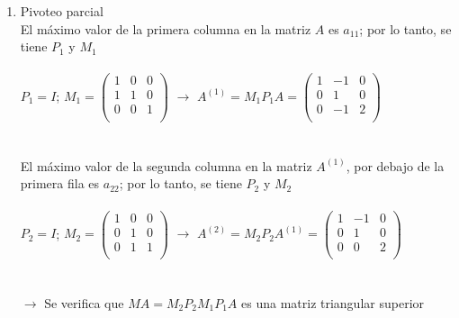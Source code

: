 \begin{enumerate}[]
    \begin{enumerate}[]
        \item Pivoteo parcial\\
        El máximo valor de la primera columna en la matriz $A$ es $a_{11}$; por lo tanto, se tiene $P_1$ y $M_1$\\
        \\
        $P_1 = I$; 
        $M_1 = \begin{pmatrix}
            1 & 0 & 0 \\ 
            1 & 1 & 0 \\
            0 & 0 & 1 \\
        \end{pmatrix} $ 
        $\xrightarrow{}$
        $A^{(1)}= M_1P_1A = \begin{pmatrix}
            1 & -1 & 0 \\ 
            0 & 1 & 0 \\
            0 & -1 & 2 \\
        \end{pmatrix}$
        \\\\\\
        El máximo valor de la segunda columna en la matriz $A^{(1)}$, por debajo de la primera fila es $a_{22}$; por lo tanto, se tiene $P_2$ y $M_2$\\\\
        $P_2 = I$; 
        $M_2 = \begin{pmatrix}
            1 & 0 & 0 \\ 
            0 & 1 & 0 \\
            0 & 1 & 1 \\
        \end{pmatrix} $ 
        $\xrightarrow{}$
        $A^{(2)}= M_2P_2A^{(1)} = \begin{pmatrix}
             1 & -1 & 0 \\ 
            0 & 1 & 0 \\
            0 & 0 & 2 \\
        \end{pmatrix}$
        \\\\\\
        $\xrightarrow{}$ Se verifica que $MA = M_2P_2M_1P_1A$ es una matriz triangular superior\\
        

\end{enumerate}
\end{enumerate}
